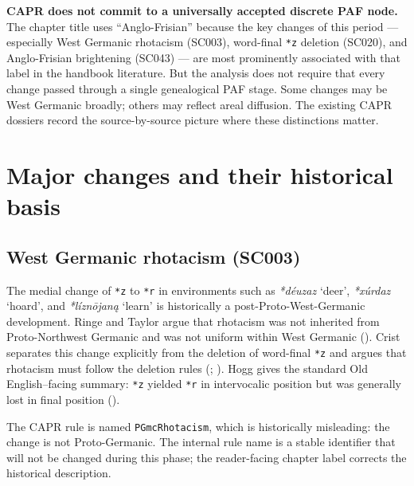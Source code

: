 \documentclass[
  british,
  a4paper,
  openany]{book}
\providecommand{\Recon}[1]{\emph{*#1}}
{\catcode`→=\active \global\def→{\ensuremath{\rightarrow}}}
\providecommand{\Recon}[1]{\emph{*#1}}
{\catcode`→=\active \global\def→{\ensuremath{\rightarrow}}}
\begin{document}
\textbf{CAPR does not commit to a universally accepted discrete PAF
node.} The chapter title uses ``Anglo-Frisian'' because the key changes
of this period --- especially West Germanic rhotacism (SC003),
word-final \texttt{*z} deletion (SC020), and Anglo-Frisian brightening
(SC043) --- are most prominently associated with that label in the
handbook literature. But the analysis does not require that every change
passed through a single genealogical PAF stage. Some changes may be West
Germanic broadly; others may reflect areal diffusion. The existing CAPR
dossiers record the source-by-source picture where these distinctions
matter.

\section{Major changes and their historical
basis}\label{major-changes-and-their-historical-basis}

\subsection{West Germanic rhotacism
(SC003)}\label{west-germanic-rhotacism-sc003}

The medial change of \texttt{*z} to \texttt{*r} in environments such as
\Recon{déuzaz}
`deer',
\Recon{xúrdaz}
`hoard', and
\Recon{líznōjaną}
`learn' is historically a post-Proto-West-Germanic development. Ringe
and Taylor argue that rhotacism was not inherited from Proto-Northwest
Germanic and was not uniform within West Germanic
().
Crist separates this change explicitly from the deletion of word-final
\texttt{*z} and argues that rhotacism must follow the deletion rules
(;
). Hogg gives the standard Old
English--facing summary: \texttt{*z} yielded \texttt{*r} in intervocalic
position but was generally lost in final position
().

The CAPR rule is named \texttt{PGmcRhotacism}, which is historically
misleading: the change is not Proto-Germanic. The internal rule name is
a stable identifier that will not be changed during this phase; the
reader-facing chapter label corrects the historical description.
\end{document}
